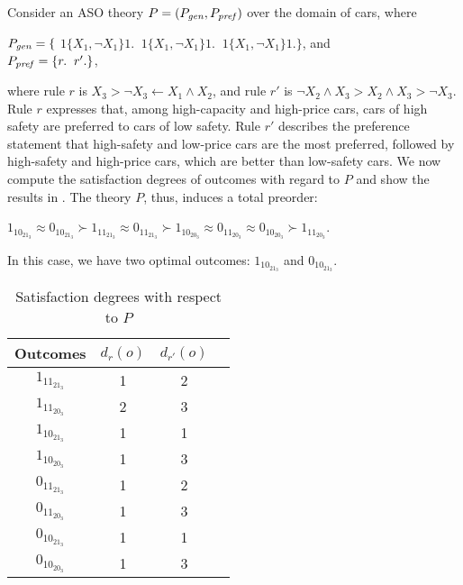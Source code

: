 Consider an ASO theory $P=(P_{\mathit{gen}}, P_{\mathit{pref}})$ over the domain 
of cars, where
\begin{center}
	$P_{\mathit{gen}}=\{$
	$1\{X_1,\neg X_1\}1.\;\; 1\{X_1,\neg X_1\}1.\;\; 1\{X_1,\neg X_1\}1.\}$,
	and\\
	$P_{\mathit{pref}}=\{r.\;\; r'.\}$,
\end{center}
where rule $r$ is $X_3 > \neg X_3 \leftarrow X_1 \land X_2$, 
and rule $r'$ is $\neg X_2 \land X_3 > X_2 \land X_3 > \neg X_3$.
Rule $r$ expresses that, among high-capacity and high-price cars,
cars of high safety are preferred to cars of low safety.
Rule $r'$ describes the preference statement that
high-safety and low-price cars are the most preferred, followed
by high-safety and high-price cars, which are better
than low-safety cars.
We now compute the satisfaction degrees of outcomes with regard to $P$
and show the results in .
The theory $P$, thus, induces a total preorder:
\begin{center}
	$1_10_21_3 \approx 0_10_21_3 \succ 1_11_21_3 \approx 0_11_21_3 \succ
		1_10_20_3 \approx 0_11_20_3 \approx 0_10_20_3 \succ 1_11_20_3$.
\end{center}
In this case, we have two optimal outcomes: $1_10_21_3$ and $0_10_21_3$.

\begin{table}
  \centering
  \small
  \begin{tabular}{ |c||c|c|c| }
    \hline
    Outcomes                 & $d_r(o)$  & $d_{r'}(o)$ \\
    \hline \hline
    $1_11_21_3$    								 & 1    & 2   \\
    \hline
    $1_11_20_3$               & 2  & 3  \\
    \hline
    $1_10_21_3$              & 1    & 1  \\
    \hline
    $1_10_20_3$          & 1  & 3    \\
    \hline
    $0_11_21_3$              & 1  & 2    \\
    \hline
    $0_11_20_3$         & 1  & 3  \\
    \hline
    $0_10_21_3$        & 1 & 1 \\
    \hline
    $0_10_20_3$   & 1  & 3   \\
    \hline
  \end{tabular}
  \caption{Satisfaction degrees with respect to $P$}
  \label{tbl:aso_ex}
\end{table}


